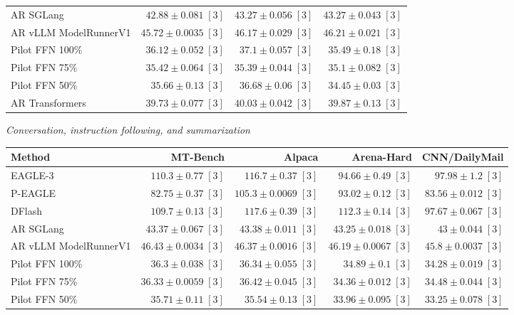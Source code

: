 \documentclass[conference,onecolumn]{IEEEtran}
\begin{document}
\begin{table}[!htp]
\begin{tabular}{@{}>{\raggedright\arraybackslash}p{3.7cm}rrr@{}}
AR \textperiodcentered{} SGLang & \(42.88 \pm 0.081\;[3]\) & \(43.27 \pm 0.056\;[3]\) & \(43.27 \pm 0.043\;[3]\) \\
AR \textperiodcentered{} vLLM ModelRunnerV1 & \(45.72 \pm 0.0035\;[3]\) & \(46.17 \pm 0.029\;[3]\) & \(46.21 \pm 0.021\;[3]\) \\
Pilot FFN 100\% & \(36.12 \pm 0.052\;[3]\) & \(37.1 \pm 0.057\;[3]\) & \(35.49 \pm 0.18\;[3]\) \\
Pilot FFN 75\% & \(35.42 \pm 0.064\;[3]\) & \(35.39 \pm 0.044\;[3]\) & \(35.1 \pm 0.082\;[3]\) \\
Pilot FFN 50\% & \(35.66 \pm 0.13\;[3]\) & \(36.68 \pm 0.06\;[3]\) & \(34.45 \pm 0.03\;[3]\) \\
AR \textperiodcentered{} Transformers & \(39.73 \pm 0.077\;[3]\) & \(40.03 \pm 0.042\;[3]\) & \(39.87 \pm 0.13\;[3]\) \\
\bottomrule
\end{tabular}\par\medskip
\textit{Conversation, instruction following, and summarization}\par\smallskip
\begin{tabular}{@{}>{\raggedright\arraybackslash}p{3.7cm}rrrr@{}}
\toprule
Method & MT-Bench & Alpaca & Arena-Hard & CNN/DailyMail \\
\midrule
EAGLE-3 & \(\mathbf{110.3} \pm 0.77\;[3]\) & \(116.7 \pm 0.37\;[3]\) & \(94.66 \pm 0.49\;[3]\) & \(\mathbf{97.98} \pm 1.2\;[3]\) \\
P-EAGLE & \(82.75 \pm 0.37\;[3]\) & \(105.3 \pm 0.0069\;[3]\) & \(93.02 \pm 0.12\;[3]\) & \(83.56 \pm 0.012\;[3]\) \\
DFlash & \(109.7 \pm 0.13\;[3]\) & \(\mathbf{117.6} \pm 0.39\;[3]\) & \(\mathbf{112.3} \pm 0.14\;[3]\) & \(97.67 \pm 0.067\;[3]\) \\
AR \textperiodcentered{} SGLang & \(43.37 \pm 0.067\;[3]\) & \(43.38 \pm 0.011\;[3]\) & \(43.25 \pm 0.018\;[3]\) & \(43 \pm 0.044\;[3]\) \\
AR \textperiodcentered{} vLLM ModelRunnerV1 & \(46.43 \pm 0.0034\;[3]\) & \(46.37 \pm 0.0016\;[3]\) & \(46.19 \pm 0.0067\;[3]\) & \(45.8 \pm 0.0037\;[3]\) \\
Pilot FFN 100\% & \(36.3 \pm 0.038\;[3]\) & \(36.34 \pm 0.055\;[3]\) & \(34.89 \pm 0.1\;[3]\) & \(34.28 \pm 0.019\;[3]\) \\
Pilot FFN 75\% & \(36.33 \pm 0.0059\;[3]\) & \(36.42 \pm 0.045\;[3]\) & \(34.36 \pm 0.012\;[3]\) & \(34.48 \pm 0.044\;[3]\) \\
Pilot FFN 50\% & \(35.71 \pm 0.11\;[3]\) & \(35.54 \pm 0.13\;[3]\) & \(33.96 \pm 0.095\;[3]\) & \(33.25 \pm 0.078\;[3]\) \\

\end{tabular}
\end{table}
\end{document}
